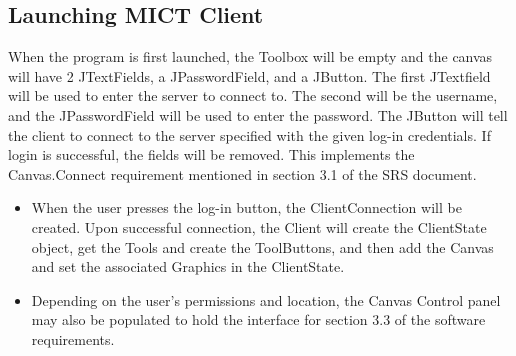 \documentclass[12pt]{article}
\begin{document}
\subsection{Launching MICT Client}
When the program is first launched, the Toolbox will be empty and the
     canvas will have 2 JTextFields, a JPasswordField, and a JButton. The first
     JTextfield will be used to enter the server to connect to. The second will
     be the username, and the JPasswordField will be used to enter the
     password. The JButton will tell the client to connect to the server
     specified with the given log-in credentials. If login is successful, the
     fields will be removed. This implements the Canvas.Connect requirement
     mentioned in section 3.1 of the SRS document.
     \begin{itemize}
     \item
     When the user presses the log-in button, the ClientConnection will be
     created. Upon successful connection, the Client will create the
     ClientState object, get the Tools and create the ToolButtons, and then add
     the Canvas and set the associated Graphics in the ClientState.
     \item
     Depending on the user's permissions and location, the Canvas Control panel may also
     be populated to hold the interface for section 3.3 of the software
     requirements.
     \end{itemize}
\end{document}
